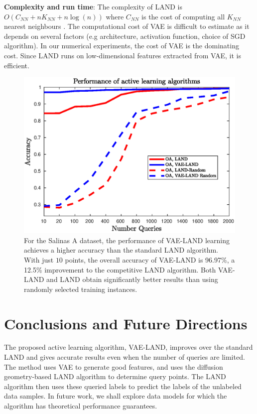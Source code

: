 \documentclass{article}
\begin{document}
\noindent \textbf{Complexity and run time}: The complexity of LAND is $O(C_{NN}+nK_{NN}+n\log(n))$ where $C_{NN}$ is the cost of computing all $K_{NN}$ nearest neighbours \cite{Maggioni2019_LAND}. 
The computational cost of VAE is difficult to estimate as it depends on several factors (e.g architecture, activation function, choice of SGD algorithm). In our numerical experiments, the cost of VAE is the dominating cost. Since LAND runs on low-dimensional features extracted from VAE, it is efficient. 

\begin{figure}
    \includegraphics[width=.45\textwidth]{Images/salinasa_results_improved.eps}
    \caption{For the Salinas A dataset, the performance of VAE-LAND learning achieves a higher accuracy than the standard LAND algorithm. With just $10$ points, the overall accuracy of VAE-LAND is 96.97\%, a 12.5\% improvement to the competitive LAND algorithm. Both VAE-LAND and LAND obtain significantly better results than using randomly selected training instances. }
    \label{fig:my_label}
\end{figure}


\section{Conclusions and Future Directions}
\label{sec:Conclusions}
The proposed active learning algorithm, VAE-LAND, improves over the standard LAND and gives accurate results even when the number of queries are limited. The method uses VAE to generate good features, and uses the diffusion geometry-based LAND algorithm to determine query points. The LAND algorithm then uses these queried labels to predict the labels of the unlabeled data samples. In future work, we shall explore data models for which the algorithm has theoretical performance guarantees.   




\end{document}

